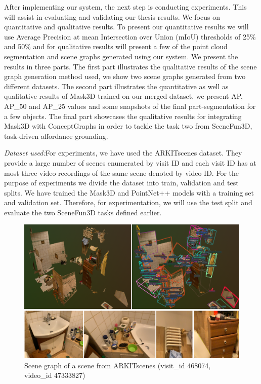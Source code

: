 After implementing our system, the next step is conducting experiments. This will assist in evaluating and validating our thesis results.
We focus on quantitative and qualitative results. To present our quantitative results we will use Average Precision at mean Intersection over Union (mIoU) thresholds of 
25\% and 50\% and for qualitative results will present a few of the point cloud segmentation and scene graphs generated using our system. We present the results in 
three parts. The first part illustrates the qualitative results of the scene graph generation method used, we show two scene graphs generated from two different datasets.
The second part illustrates the quantitative as well as qualitative results of Mask3D trained on our merged dataset, we present AP, AP\_50 and AP\_25 values and some 
snapshots of the final part-segmentation for a few objects. The final part showcases the qualitative results for integrating Mask3D with ConceptGraphs in order to
tackle the task two from SceneFun3D, task-driven affordance grounding.

\textit{Dataset used:}For experiments, we have used the ARKITscenes dataset. They provide a large number of scenes enumerated by visit ID and each visit ID has at most three 
video recordings of the same scene denoted by video ID. For the purpose of experiments we divide the dataset into train, validation and test splits. We have trained
the Mask3D and PointNet++ models with a training set and validation set. Therefore, for experimentation, we will use the test split and evaluate the two SceneFun3D tasks defined 
earlier. 
\begin{figure}[ht!]
    \centering
    \includegraphics[width=\textwidth]{content/images/results/SF_SG.png}
    \caption{Scene graph of a scene from ARKITscenes (visit\_id 468074, video\_id 47333827)}
    \label{fig:result1}
\end{figure}
